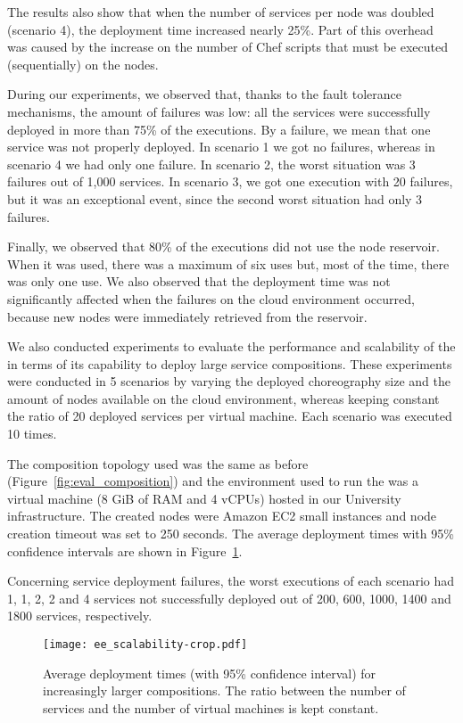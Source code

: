 The results also show that when the number of services per node was doubled (scenario 4),
the deployment time increased nearly 25\%. Part of this overhead was caused by
the increase on the number of Chef scripts that must be executed (sequentially)
on the nodes.

During our experiments, we observed that, thanks to the \ee fault tolerance mechanisms, the amount of failures was
low: all the services were successfully deployed in more than 75\% of the executions.
By a failure, we mean that one service was not properly deployed.
In scenario 1 we got no failures, 
whereas in scenario 4 we had only one failure.
In scenario 2, the worst situation was 3 failures out of 1,000 services.
In scenario 3, we got one execution with 20 failures, but it was an exceptional event,
since the second worst situation had only 3 failures.

Finally, we observed that 80\% of the executions did not use the node reservoir.
When it was used, there was a maximum of six uses
but, most of the time, there was only one use.
We also observed that the deployment time was not significantly affected
when the failures on the cloud environment occurred,
because new nodes were immediately retrieved from the reservoir.


We also conducted experiments to evaluate the performance and scalability of
the \choreos \ee in terms of its capability to deploy large service compositions.
These experiments were conducted in 5 scenarios by varying the deployed choreography size
and the amount of nodes available on the cloud environment, whereas keeping constant the ratio of 20 deployed services per virtual machine. Each scenario was executed 10 times.

The composition topology used was the same as before (Figure~\ref{fig:eval_composition}) and
the environment used to run the \ee
was a virtual machine (8 GiB of RAM and 4 vCPUs) hosted in our University infrastructure.
The created nodes were Amazon EC2 small instances and 
node creation timeout was set to 250 seconds. 
The average deployment times with 95\% confidence intervals
are shown in Figure~\ref{fig:ee_scalability}.

Concerning service deployment failures,
the worst executions of each scenario had 1, 1, 2, 2 and 4 services not successfully deployed
out of 200, 600, 1000, 1400 and 1800 services, respectively.

\begin{figure}[h]
  \centering
  \texttt{[image: ee\_scalability-crop.pdf]}
  \caption{Average deployment times (with 95\% confidence interval) for increasingly larger compositions. The ratio between the number of services and the number of virtual machines is kept constant.}
  \label{fig:ee_scalability}
\end{figure}

